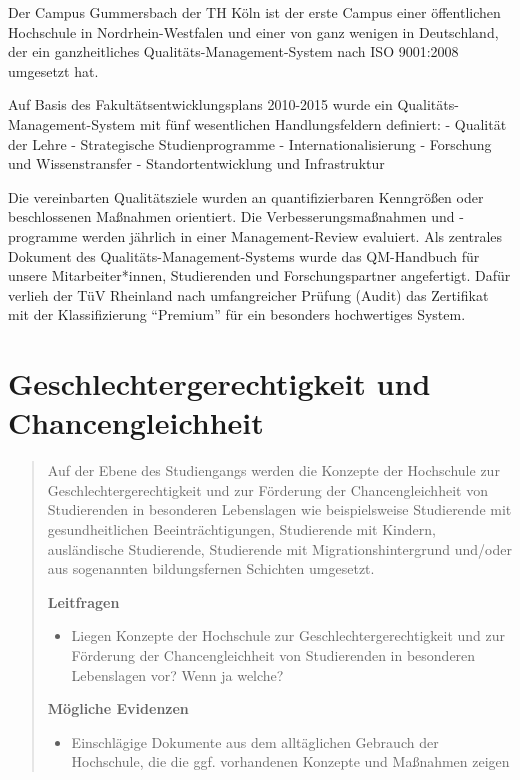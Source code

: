 Der Campus Gummersbach der TH Köln ist der erste Campus einer
öffentlichen Hochschule in Nordrhein-Westfalen und einer von ganz
wenigen in Deutschland, der ein ganzheitliches
Qualitäts-Management-System nach ISO 9001:2008 umgesetzt hat.

Auf Basis des Fakultätsentwicklungsplans 2010-2015 wurde ein
Qualitäts-Management-System mit fünf wesentlichen Handlungsfeldern
definiert: - Qualität der Lehre - Strategische Studienprogramme -
Internationalisierung - Forschung und Wissenstransfer -
Standortentwicklung und Infrastruktur

Die vereinbarten Qualitätsziele wurden an quantifizierbaren Kenngrößen
oder beschlossenen Maßnahmen orientiert. Die Verbesserungsmaßnahmen und
-programme werden jährlich in einer Management-Review evaluiert. Als
zentrales Dokument des Qualitäts-Management-Systems wurde das
QM-Handbuch für unsere Mitarbeiter*innen, Studierenden und
Forschungspartner angefertigt. Dafür verlieh der TüV Rheinland nach
umfangreicher Prüfung (Audit) das Zertifikat mit der Klassifizierung
``Premium'' für ein besonders hochwertiges System.

\chapter{Geschlechtergerechtigkeit und
Chancengleichheit}\label{geschlechtergerechtigkeit-und-chancengleichheit}

\begin{quote}
Auf der Ebene des Studiengangs werden die Konzepte der Hochschule zur
Geschlechtergerechtigkeit und zur Förderung der Chancengleichheit von
Studierenden in besonderen Lebenslagen wie beispielsweise Studierende
mit gesundheitlichen Beeinträchtigungen, Studierende mit Kindern,
ausländische Studierende, Studierende mit Migrationshintergrund und/oder
aus sogenannten bildungsfernen Schichten umgesetzt.

\textbf{Leitfragen}

\begin{itemize}
\tightlist
\item
  Liegen Konzepte der Hochschule zur Geschlechtergerechtigkeit und zur
  Förderung der Chancengleichheit von Studierenden in besonderen
  Lebenslagen vor? Wenn ja welche?
\end{itemize}

\textbf{Mögliche Evidenzen}

\begin{itemize}
\tightlist
\item
  Einschlägige Dokumente aus dem alltäglichen Gebrauch der Hochschule,
  die die ggf. vorhandenen Konzepte und Maßnahmen zeigen
\end{itemize}
\end{quote}

